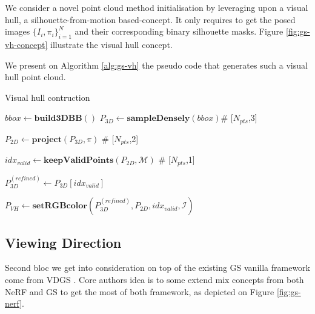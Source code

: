 We consider a novel point cloud method initialisation by leveraging upon a visual hull, a silhouette-from-motion \citep{baumgart1974geometric} based-concept. It only requires to get the posed images $\{I_{i},\pi_{i}\}_{i=1}^{N}$ and their corresponding binary silhouette masks. Figure \ref{fig:gs-vh-concept} illustrate the visual hull concept. 

We present on Algorithm \ref{alg:gs-vh} the pseudo code that generates such a visual hull point cloud. 

\begin{algorithm}[htpb!]
  \caption{Visual hull contruction}\label{alg:gs-vh}
  \medskip
  \medskip
  $bbox \gets \mathbf{build3DBB}()$ 
  $P_{3D} \gets \mathbf{sampleDensely}(bbox)$\hspace{.4cm}\textcolor{gray!80}{\# 
    [$N_{pts}$,3]} 

   $P_{2D} \gets \mathbf{project}(P_{3D},\pi)$ \hspace{.4cm}\textcolor{gray!80}{\# 
    [$N_{pts}$,2]} 
    
    $idx_{valid} \gets \mathbf{keepValidPoints}(P_{2D},\mathcal{M})$ \hspace{.4cm}\textcolor{gray!80}{\# 
    [$N_{pts}$,1]} 

    $P_{3D}^{(refined)} \gets P_{3D}[idx_{valid}]$ 

    $P_{VH} \gets \mathbf{setRGBcolor}(P_{3D}^{(refined)},P_{2D},idx_{valid},\mathcal{I})$ 
\end{algorithm}


\subsection{Viewing Direction}
Second bloc we get into consideration on top of the existing GS vanilla framework come from \ac{VDGS} \citep{malarz2023gaussian}. Core authors idea is to some extend mix concepts from both NeRF and GS to get the most of both framework, as depicted on Figure \ref{fig:gs-nerf}. 

